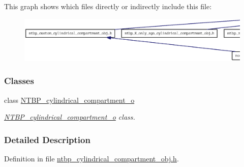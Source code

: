 This graph shows which files directly or indirectly include this file:
\nopagebreak
\begin{figure}[H]
\begin{center}
\leavevmode
\includegraphics[width=400pt]{ntbp__cylindrical__compartment__obj_8h__dep__incl}
\end{center}
\end{figure}
\subsubsection*{Classes}
\begin{DoxyCompactItemize}
\item 
class \hyperlink{class_n_t_b_p__cylindrical__compartment__o}{NTBP\_\-cylindrical\_\-compartment\_\-o}
\begin{DoxyCompactList}\small\item\em \hyperlink{class_n_t_b_p__cylindrical__compartment__o}{NTBP\_\-cylindrical\_\-compartment\_\-o} class. \item\end{DoxyCompactList}\end{DoxyCompactItemize}


\subsubsection{Detailed Description}


Definition in file \hyperlink{ntbp__cylindrical__compartment__obj_8h_source}{ntbp\_\-cylindrical\_\-compartment\_\-obj.h}.

